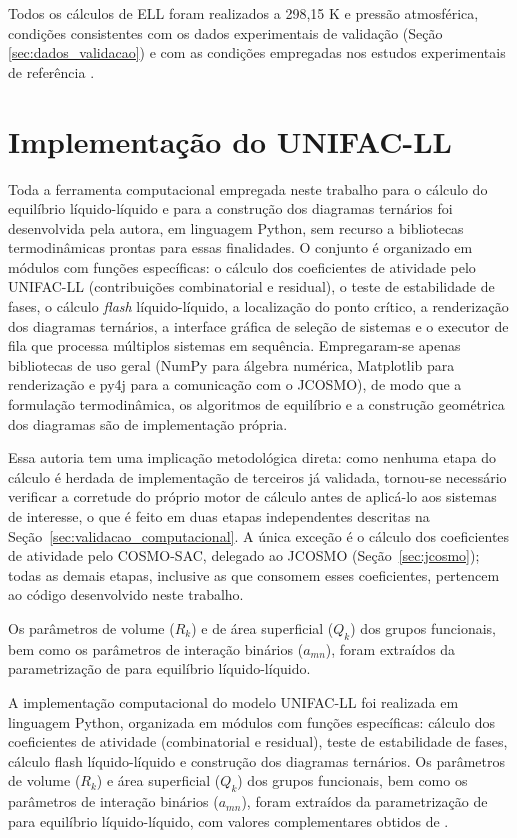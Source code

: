 Todos os cálculos de ELL foram realizados a 298,15 K e pressão atmosférica, condições consistentes com os dados experimentais de validação (Seção \ref{sec:dados_validacao}) e com as condições empregadas nos estudos experimentais de referência \cite{trindade2019,gomez2019}.

\section{Implementação do UNIFAC-LL}
\label{sec:unifac_implementacao}

Toda a ferramenta computacional empregada neste trabalho para o cálculo do equilíbrio líquido-líquido e para a construção dos diagramas ternários foi desenvolvida pela autora, em linguagem Python, sem recurso a bibliotecas termodinâmicas prontas para essas finalidades. O conjunto é organizado em módulos com funções específicas: o cálculo dos coeficientes de atividade pelo UNIFAC-LL (contribuições combinatorial e residual), o teste de estabilidade de fases, o cálculo \textit{flash} líquido-líquido, a localização do ponto crítico, a renderização dos diagramas ternários, a interface gráfica de seleção de sistemas e o executor de fila que processa múltiplos sistemas em sequência. Empregaram-se apenas bibliotecas de uso geral (NumPy para álgebra numérica, Matplotlib para renderização e py4j para a comunicação com o JCOSMO), de modo que a formulação termodinâmica, os algoritmos de equilíbrio e a construção geométrica dos diagramas são de implementação própria.
 
Essa autoria tem uma implicação metodológica direta: como nenhuma etapa do cálculo é herdada de implementação de terceiros já validada, tornou-se necessário verificar a corretude do próprio motor de cálculo antes de aplicá-lo aos sistemas de interesse, o que é feito em duas etapas independentes descritas na Seção~\ref{sec:validacao_computacional}. A única exceção é o cálculo dos coeficientes de atividade pelo COSMO-SAC, delegado ao JCOSMO (Seção~\ref{sec:jcosmo}); todas as demais etapas, inclusive as que consomem esses coeficientes, pertencem ao código desenvolvido neste trabalho.
 
Os parâmetros de volume ($R_k$) e de área superficial ($Q_k$) dos grupos funcionais, bem como os parâmetros de interação binários ($a_{mn}$), foram extraídos da parametrização de  para equilíbrio líquido-líquido.

A implementação computacional do modelo UNIFAC-LL foi realizada em linguagem Python, organizada em módulos com funções específicas: cálculo dos coeficientes de atividade (combinatorial e residual), teste de estabilidade de fases, cálculo flash líquido-líquido e construção dos diagramas ternários. Os parâmetros de volume ($R_k$) e área superficial ($Q_k$) dos grupos funcionais, bem como os parâmetros de interação binários ($a_{mn}$), foram extraídos da parametrização de  para equilíbrio líquido-líquido, com valores complementares obtidos de .

